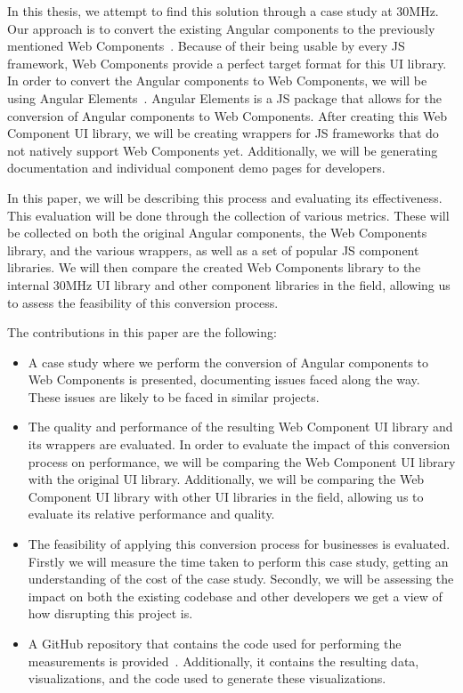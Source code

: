 In this thesis, we attempt to find this solution through a case study at 30MHz. Our approach is to convert the existing Angular components to the previously mentioned Web Components~. Because of their being usable by every JS framework, Web Components provide a perfect target format for this UI library. In order to convert the Angular components to Web Components, we will be using Angular Elements~. Angular Elements is a JS package that allows for the conversion of Angular components to Web Components. After creating this Web Component UI library, we will be creating wrappers for JS frameworks that do not natively support Web Components yet. Additionally, we will be generating documentation and individual component demo pages for developers.

In this paper, we will be describing this process and evaluating its effectiveness. This evaluation will be done through the collection of various metrics. These will be collected on both the original Angular components, the Web Components library, and the various wrappers, as well as a set of popular JS component libraries. We will then compare the created Web Components library to the internal 30MHz UI library and other component libraries in the field, allowing us to assess the feasibility of this conversion process.

The contributions in this paper are the following:

\begin{itemize}
	\item A case study where we perform the conversion of Angular components to Web Components is presented, documenting issues faced along the way. These issues are likely to be faced in similar projects.
	\item The quality and performance of the resulting Web Component UI library and its wrappers are evaluated. In order to evaluate the impact of this conversion process on performance, we will be comparing the Web Component UI library with the original UI library. Additionally, we will be comparing the Web Component UI library with other UI libraries in the field, allowing us to evaluate its relative performance and quality.
	\item The feasibility of applying this conversion process for businesses is evaluated. Firstly we will measure the time taken to perform this case study, getting an understanding of the cost of the case study. Secondly, we will be assessing the impact on both the existing codebase and other developers we get a view of how disrupting this project is.
	\item A GitHub repository that contains the code used for performing the measurements is provided~. Additionally, it contains the resulting data, visualizations, and the code used to generate these visualizations.
\end{itemize}